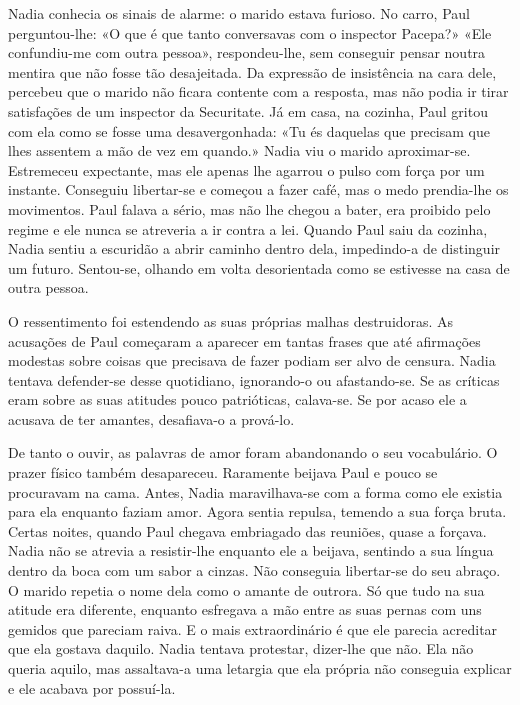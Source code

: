Nadia conhecia os sinais de alarme: o marido estava furioso. No carro,
Paul perguntou-lhe: «O que é que tanto conversavas com o inspector
Pacepa?» «Ele confundiu-me com outra pessoa», respondeu-lhe, sem
conseguir pensar noutra mentira que não fosse tão desajeitada. Da
expressão de insistência na cara dele, percebeu que o marido não
ficara contente com a resposta, mas não podia ir tirar
satisfações de um inspector da Securitate. Já em casa, na cozinha, Paul
gritou com ela como se fosse uma desavergonhada: «Tu és daquelas que
precisam que lhes assentem a mão de vez em quando.» Nadia viu o marido
aproximar-se. Estremeceu expectante, mas ele apenas lhe agarrou o pulso com força
por um instante. Conseguiu libertar-se e começou a fazer café, mas o
medo prendia-lhe os movimentos. Paul falava a sério, mas não lhe
chegou a bater, era proibido pelo regime e ele nunca se atreveria a ir
contra a lei. Quando Paul saiu da cozinha, Nadia sentiu a escuridão a
abrir caminho dentro dela, impedindo-a de distinguir um futuro.
Sentou-se, olhando em volta desorientada como se estivesse na casa de
outra pessoa.

O ressentimento foi estendendo as suas próprias malhas destruidoras. As
acusações de Paul começaram a aparecer em tantas frases que até
afirmações modestas sobre coisas que precisava de fazer podiam ser alvo
de censura. Nadia tentava defender-se desse quotidiano, ignorando-o ou
afastando-se. Se as críticas eram sobre as suas atitudes pouco
patrióticas, calava-se. Se por acaso ele a acusava de ter amantes,
desafiava-o a prová-lo.

De tanto o ouvir, as palavras de amor foram abandonando o seu
vocabulário. O prazer físico também desapareceu. Raramente beijava
Paul e pouco se procuravam na cama. Antes, Nadia maravilhava-se com a
forma como ele existia para ela enquanto faziam amor. Agora sentia
repulsa, temendo a sua força bruta. Certas noites, quando Paul chegava
embriagado das reuniões, quase a forçava. Nadia não se atrevia a
resistir-lhe enquanto ele a beijava, sentindo a sua língua dentro da
boca com um sabor a cinzas. Não conseguia libertar-se do seu abraço. O marido repetia o nome
dela como o amante de outrora. Só que tudo na sua atitude era diferente,
enquanto esfregava a mão entre as suas pernas com uns gemidos que
pareciam raiva. E o mais extraordinário é que ele parecia acreditar que
ela gostava daquilo. Nadia tentava protestar, dizer-lhe que não. Ela não
queria aquilo, mas assaltava-a uma letargia que ela própria não
conseguia explicar e ele acabava por possuí-la.

